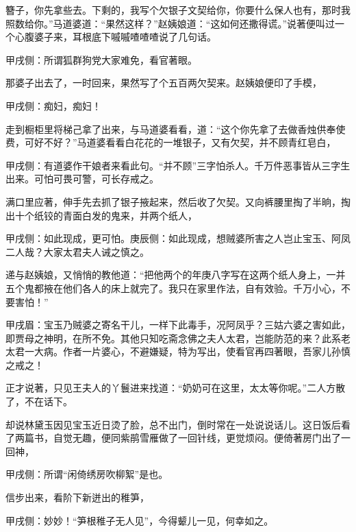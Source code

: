 \begin{parag}
簪子，你先拿些去。下剩的，我写个欠银子文契给你，你要什么保人也有，那时我照数给你。”马道婆道：“果然这样？”赵姨娘道：“这如何还撒得谎。”说著便叫过一个心腹婆子来，耳根底下嘁嘁喳喳喳说了几句话。\begin{note}甲戌侧：所谓狐群狗党大家难免，看官著眼。\end{note}那婆子出去了，一时回来，果然写了个五百两欠契来。赵姨娘便印了手模，\begin{note}甲戌侧：痴妇，痴妇！\end{note}走到橱柜里将梯己拿了出来，与马道婆看看，道：“这个你先拿了去做香烛供奉使费，可好不好？”马道婆看看白花花的一堆银子，又有欠契，并不顾青红皂白，\begin{note}甲戌侧：有道婆作干娘者来看此句。“并不顾”三字怕杀人。千万件恶事皆从三字生出来。可怕可畏可警，可长存戒之。\end{note}满口里应著，伸手先去抓了银子掖起来，然后收了欠契。又向裤腰里掏了半晌，掏出十个纸铰的青面白发的鬼来，并两个纸人，\begin{note}甲戌侧：如此现成，更可怕。庚辰侧：如此现成，想贼婆所害之人岂止宝玉、阿凤二人哉？大家太君夫人诫之慎之。\end{note}递与赵姨娘，又悄悄的教他道：“把他两个的年庚八字写在这两个纸人身上，一并五个鬼都掖在他们各人的床上就完了。我只在家里作法，自有效验。千万小心，不要害怕！”\begin{note}甲戌眉：宝玉乃贼婆之寄名干儿，一样下此毒手，况阿凤乎？三姑六婆之害如此，即贾母之神明，在所不免。其他只知吃斋念佛之夫人太君，岂能防范的来？此系老太君一大病。作者一片婆心，不避嫌疑，特为写出，使看官再四著眼，吾家儿孙慎之戒之！\end{note}正才说著，只见王夫人的丫鬟进来找道：“奶奶可在这里，太太等你呢。”二人方散了，不在话下。
\end{parag}


\begin{parag}
    却说林黛玉因见宝玉近日烫了脸，总不出门，倒时常在一处说说话儿。这日饭后看了两篇书，自觉无趣，便同紫鹃雪雁做了一回针线，更觉烦闷。便倚著房门出了一回神，\begin{note}甲戌侧：所谓“闲倚绣房吹柳絮”是也。\end{note}信步出来，看阶下新迸出的稚笋，\begin{note}甲戌侧：妙妙！“笋根稚子无人见”，今得颦儿一见，何幸如之。\end{note}
\end{parag}


